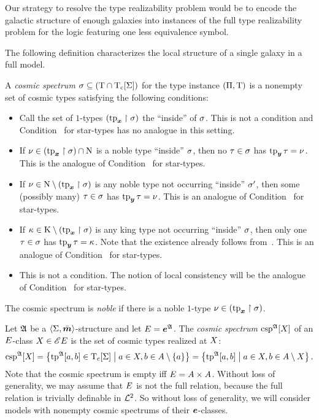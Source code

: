 Our strategy to resolve the type realizability problem would be to encode the
galactic structure of enough galaxies into instances of the full type
realizability problem for the logic featuring one less equivalence symbol.

The following definition characterizes the local structure of a single galaxy in
a full model.
\begin{definition}
A \emph{cosmic spectrum} $\sigma \subseteq (\mathrm{T} \cap \mathrm{T}_{\mathrm{c}}[\mathrm{\Sigma}])$ for the
type instance $(\Pi,\mathrm{T})$ is a nonempty set of cosmic types satisfying
the following conditions:
\begin{itemize}
  \item[\cspcondIp]\label{cond:csp-Ip}
  Call the set of $1$-types $(\operatorname{tp}_{\bm{x}}\restriction\sigma)$ the ``inside'' of $\sigma$.
  This is not a condition and Condition~ for star-types has no
  analogue in this setting.
  \item[\cspcondIIp]\label{cond:csp-IIp}
  If $\nu \in (\operatorname{tp}_{\bm{x}}\restriction\sigma) \cap \mathrm{\mathrm{N}}$ is a noble type
  ``inside'' $\sigma$, then no $\tau \in \sigma$ has $\operatorname{tp}_{\bm{y}}\tau = \nu$.
  This is the analogue of Condition~ for star-types.
  \item[\cspcondIIIn]\label{cond:csp-IIIn}
  If $\nu \in \mathrm{\mathrm{N}} \setminus (\operatorname{tp}_{\bm{x}}\restriction\sigma)$ is any noble type not
  occurring ``inside'' $\sigma'$, then some (possibly many) $\tau \in \sigma$ has
  $\operatorname{tp}_{\bm{y}}\tau = \nu$.
  This is an analogue of Condition~ for star-types.
  \item[\cspcondIIIk]\label{cond:csp-IIIk}
  If $\kappa \in \mathrm{K} \setminus (\operatorname{tp}_{\bm{x}}\restriction\sigma)$ is any king type not
  occurring ``inside'' $\sigma$, then only one $\tau \in \sigma$ has $\operatorname{tp}_{\bm{y}}\tau =
  \kappa$.
  Note that the existence already follows from~.
  This is an analogue of Condition~ for star-types.
  \item[\cspcondIVp]\label{cond:csp-IVp}
  This is not a condition. The notion of local consistency
  will be the analogue of Condition~ for star-types.
\end{itemize}
The cosmic spectrum is \emph{noble} if there is a noble $1$-type $\nu \in
(\operatorname{tp}_{\bm{x}}\restriction\sigma)$.
\end{definition}
\begin{definition}
Let $\mathfrak{A}$ be a $\left\langle \mathrm{\Sigma},\bar{\bm{m}} \right\rangle$-structure and let $E = \bm{e}^{\mathfrak{A}}$.
The \emph{cosmic spectrum} $\operatorname{csp}^{\mathfrak{A}}[X]$ of an $E$-class
$X \in {\mathscr{E}E}$ is the set of cosmic types realized at $X$:
\[
  \operatorname{csp}^{\mathfrak{A}}[X] = \left\{\operatorname{tp}^{\mathfrak{A}}[a,b] \in \mathrm{T}_{\mathrm{c}}[\mathrm{\Sigma}]\mathrel{}\middle|\mathrel{}a\in X, b 
  \in A\setminus\left\{a\right\}\right\} = \left\{\operatorname{tp}^{\mathfrak{A}}[a,b]\mathrel{}\middle|\mathrel{}a \in X, b \in
  A \setminus X\right\}.
\]
Note that the cosmic spectrum is empty iff $E = A\times A$.
Without loss of generality, we may assume that $E$ is not the full relation,
because the full relation is trivially definable in $\mathcal{L}^{2}$. So without loss of
generality, we will consider models with nonempty cosmic spectrums of their
$\bm{e}$-classes.
\end{definition}
